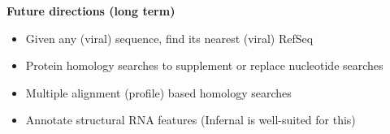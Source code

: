 \documentclass[landscape]{slides}
\begin{document}
\begin{slide}
\begin{center}
\textbf{Future directions (long term)}

\small

\begin{itemize}
\item  Given any (viral) sequence, find its nearest (viral) RefSeq
\item  Protein homology searches to supplement or replace nucleotide searches
\item  Multiple alignment (profile) based homology searches 
\item  Annotate structural RNA features (Infernal is well-suited for this)
\end{itemize}


\vfill
\end{center}
\end{slide}
\end{document}
